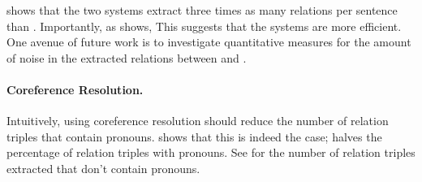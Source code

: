  shows that
the two \openie{} systems extract three times
as many relations per sentence than \reverb{}. Importantly,
as  shows,
This suggests 
that the \openie{} systems are more efficient. One avenue
of future work is to investigate quantitative measures for
the amount of noise in the extracted relations between \openie{}
and \reverb{}.

\paragraph{Coreference Resolution.}
Intuitively, using coreference resolution should reduce the number
of relation triples that contain pronouns.  shows
that this is indeed the case; \openiecoref{} halves the percentage
of relation triples with pronouns. See  for the
number of relation triples extracted that don't contain pronouns.
